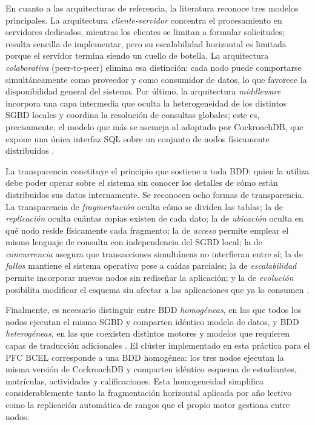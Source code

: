 \documentclass[10pt,a4paper]{article}
\begin{document}
En cuanto a las arquitecturas de referencia, la literatura reconoce tres modelos
principales. La arquitectura \emph{cliente-servidor} concentra el procesamiento en
servidores dedicados, mientras los clientes se limitan a formular solicitudes; resulta
sencilla de implementar, pero su escalabilidad horizontal es limitada porque el
servidor termina siendo un cuello de botella. La arquitectura \emph{colaborativa}
(peer-to-peer) elimina esa distinción: cada nodo puede comportarse simultáneamente
como proveedor y como consumidor de datos, lo que favorece la disponibilidad general
del sistema. Por último, la arquitectura \emph{middleware} incorpora una capa
intermedia que oculta la heterogeneidad de los distintos SGBD locales y coordina la
resolución de consultas globales; este es, precisamente, el modelo que más se asemeja
al adoptado por CockroachDB, que expone una única interfaz SQL sobre un conjunto de
nodos físicamente distribuidos \cite{kleppmann2017}.

La transparencia constituye el principio que sostiene a toda BDD: quien la utiliza
debe poder operar sobre el sistema sin conocer los detalles de cómo están distribuidos
sus datos internamente. Se reconocen ocho formas de transparencia. La transparencia de
\emph{fragmentación} oculta cómo se dividen las tablas; la de \emph{replicación}
oculta cuántas copias existen de cada dato; la de \emph{ubicación} oculta en qué nodo
reside físicamente cada fragmento; la de \emph{acceso} permite emplear el mismo
lenguaje de consulta con independencia del SGBD local; la de \emph{concurrencia}
asegura que transacciones simultáneas no interfieran entre sí; la de \emph{fallos}
mantiene el sistema operativo pese a caídas parciales; la de \emph{escalabilidad}
permite incorporar nuevos nodos sin rediseñar la aplicación; y la de \emph{evolución}
posibilita modificar el esquema sin afectar a las aplicaciones que ya lo consumen
\cite{ozsu2020}.

Finalmente, es necesario distinguir entre BDD \emph{homogéneas}, en las que todos los
nodos ejecutan el mismo SGBD y comparten idéntico modelo de datos, y BDD
\emph{heterogéneas}, en las que coexisten distintos motores y modelos que requieren
capas de traducción adicionales \cite{kleppmann2017}. El clúster implementado en esta
práctica para el PFC BCEL corresponde a una BDD homogénea: los tres nodos ejecutan la
misma versión de CockroachDB y comparten idéntico esquema de estudiantes, matrículas,
actividades y calificaciones. Esta homogeneidad simplifica considerablemente tanto la
fragmentación horizontal aplicada por año lectivo como la replicación automática de
rangos que el propio motor gestiona entre nodos.
\end{document}
